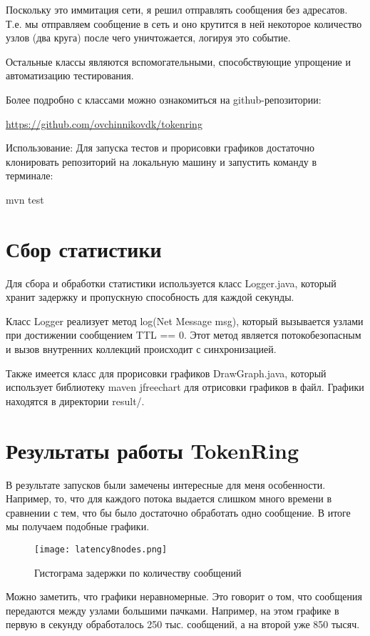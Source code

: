 \documentclass{mipt-thesis-bs}
\begin{document}
Поскольку это иммитация сети, я решил отправлять сообщения без адресатов. Т.е. мы отправляем сообщение в сеть и оно крутится в ней некоторое количество узлов (два круга) после чего уничтожается, логируя это событие.

Остальные классы являются вспомогательными, способствующие упрощение и автоматизацию тестирования.

Более подробно с классами можно ознакомиться на github-репозитории: 

\url{https://github.com/ovchinnikovdk/tokenring}

Использование:
Для запуска тестов и прорисовки графиков достаточно клонировать репозиторий на локальную машину и запустить команду в терминале: 

mvn test

\chapter{Сбор статистики}
Для сбора и обработки статистики используется класс Logger.java, который хранит задержку и пропускную способность для каждой секунды.

Класс Logger реализует метод log(Net Message msg), который вызывается узлами при достижении сообщением TTL == 0. Этот метод является потокобезопасным и вызов внутренних коллекций происходит с синхронизацией. 

Также имеется класс для прорисовки графиков DrawGraph.java, который использует библиотеку maven jfreechart для отрисовки графиков в файл. Графики находятся в директории result/. 

\chapter{Результаты работы TokenRing}
В результате запусков были замечены интересные для меня особенности. 
Например, то, что для каждого потока выдается слишком много времени в сравнении с тем, что бы было достаточно обработать одно сообщение. В итоге мы получаем подобные графики. 

\begin{figure}
\centering
\texttt{[image: latency8nodes.png]}
\caption{Гистограма задержки по количеству сообщений}
 \label{figure:latency1}
\end{figure}

Можно заметить, что графики неравномерные. Это говорит о том, что сообщения передаются между узлами большими пачками. Например, на этом графике в первую в секунду обработалось 250 тыс. сообщений, а на второй уже 850 тысяч. 
\end{document}
